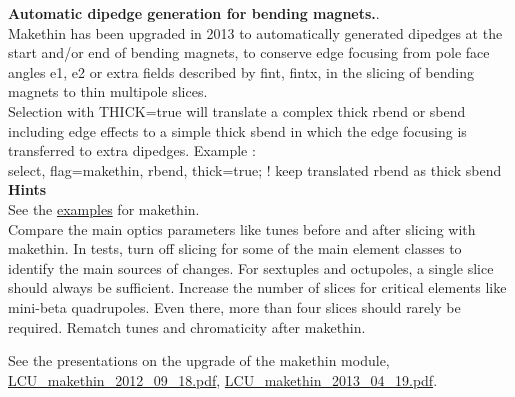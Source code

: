 \documentclass{article}    %
\begin{document}
\noindent
{\bf Automatic dipedge generation for bending magnets.}.\\
Makethin has been upgraded in 2013 to automatically generated dipedges at the start and/or end of bending magnets, to conserve edge focusing from pole face angles e1, e2 or extra fields described by fint, fintx, in the slicing of bending magnets to thin multipole slices.\\
Selection with \textsf{\color{darkgreen}THICK=true} will translate a complex thick rbend or sbend including edge effects to a simple thick sbend in which the edge focusing is transferred to extra dipedges. Example :\\
\textsf{\color{darkgreen}select, flag=makethin, rbend, thick=true; ! keep translated rbend as thick sbend}\\

\noindent
{\bf Hints}\\
See the \href{http://madx.web.cern.ch/madx/madX/examples/makethin/}{examples} for makethin.\\
Compare the main optics parameters like tunes before and after slicing with makethin.
In tests, turn off slicing for some of the main element classes to identify the main sources of changes.
For sextuples and octupoles, a single slice should always be sufficient.
Increase the number of slices for critical elements like mini-beta quadrupoles. Even there, more than four slices should rarely be required.
Rematch tunes and chromaticity after makethin.

\noindent
See the presentations on the upgrade of the makethin module,\\
\href{http://ab-dep-abp.web.cern.ch/ab-dep-abp/LCU/LCU_meetings/2012/20120918/LCU_makethin_2012_09_18.pdf}{LCU\_makethin\_2012\_09\_18.pdf},
\hspace{0.2cm}
\href{http://ab-dep-abp.web.cern.ch/ab-dep-abp/LCU/LCU_meetings/2013/20130419/LCU_makethin_2013_04_19.pdf}{LCU\_makethin\_2013\_04\_19.pdf}.
\end{document}
